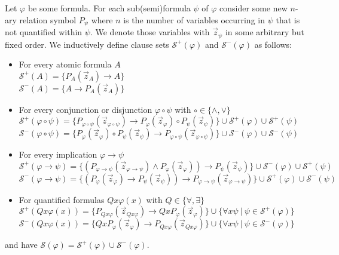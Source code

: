 \documentclass[a4paper,UKenglish,cleveref, autoref, thm-restate]{lipics-v2021}
\begin{document}
\begin{definition}
	Let $\varphi$ be some formula. For each sub(semi)formula $\psi$ of $\varphi$ consider some new $n$-ary relation symbol $P_\psi$ where $n$ is the number of variables occurring in $\psi$ that is not quantified within $\psi$. We denote those variables with $\vec z_\psi$ in some arbitrary but fixed order. We inductively define clause sets $\mathcal S^+(\varphi)$ and $\mathcal S^-(\varphi)$ as follows:
	\begin{itemize}
		\item For every atomic formula $A$\\$\mathcal S^+(A) = \{P_A(\vec z_A)\to A\}$\\$\mathcal S^-(A) = \{A\to P_A(\vec z_A)\}$
		\item For every conjunction or disjunction $\varphi\circ\psi$ with $\circ\in\{\wedge,\vee\}$\\$\mathcal S^+(\varphi\circ\psi) = \{P_{\varphi\circ\psi}(\vec z_{\varphi\circ\psi})\to P_{\varphi}(\vec z_\varphi)\circ P_{\psi}(\vec z_\psi)\}\cup \mathcal S^+(\varphi)\cup \mathcal S^+(\psi)$\\$\mathcal S^-(\varphi\circ\psi) =\{P_{\varphi}(\vec z_\varphi)\circ P_{\psi}(\vec z_\psi)\to P_{\varphi\circ\psi}(\vec z_{\varphi\circ\psi})\}\cup \mathcal S^-(\varphi)\cup \mathcal S^-(\psi)$
		\item For every implication $\varphi \to\psi$\\$\mathcal S^+(\varphi\to\psi) = \{(P_{\varphi\to\psi}(\vec z_{\varphi\to\psi})\wedge P_{\varphi}(\vec z_\varphi))\to P_{\psi}(\vec z_\psi)\}\cup \mathcal S^-(\varphi)\cup \mathcal S^+(\psi)$\\$\mathcal S^-(\varphi\to\psi)  = \{(P_{\varphi}(\vec z_\varphi)\to P_{\psi}(\vec z_\psi))\to P_{\varphi\to\psi}(\vec z_{\varphi\to\psi})\}\cup \mathcal S^+(\varphi)\cup \mathcal S^-(\psi)$
		\item For quantified formulas $Qx\varphi(x)$ with $Q\in \{\forall,\exists\}$\\$\mathcal S^+(Qx\varphi(x)) = \{P_{Qx\varphi}(\vec z_{Qx\varphi})\to QxP_{\varphi}(\vec z_{\varphi})\}\cup \{\forall x\psi\:|\:\psi\in\mathcal S^+(\varphi)\}$\\$\mathcal S^-(Qx\varphi(x))  = \{QxP_{\varphi}(\vec z_{\varphi})\to P_{Qx\varphi}(\vec z_{Qx\varphi})\}\cup \{\forall x\psi\:|\:\psi\in\mathcal S^-(\varphi)\}$
	\end{itemize}
	and have $\mathcal S(\varphi) = \mathcal S^+(\varphi)\cup\mathcal S^-(\varphi)$.
\end{definition}
\end{document}
